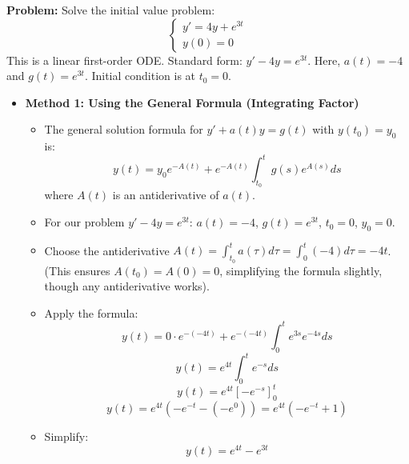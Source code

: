 \begin{cascade}
	\textbf{Problem:} Solve the initial value problem:
	$$ \begin{cases} y' = 4y + e^{3t} \\ y(0) = 0 \end{cases} $$
	This is a linear first-order ODE. Standard form: $y' - 4y = e^{3t}$.
	Here, $a(t) = -4$ and $g(t) = e^{3t}$. Initial condition is at $t_0=0$.

	\begin{itemize}
		\item \textbf{Method 1: Using the General Formula (Integrating Factor)}
		      \begin{itemize}
			      \item The general solution formula for $y' + a(t)y = g(t)$ with $y(t_0)=y_0$ is:
			            $$ y(t) = y_0 e^{-A(t)} + e^{-A(t)} \int_{t_0}^t g(s) e^{A(s)} ds $$
			            where $A(t)$ is an antiderivative of $a(t)$.
			      \item For our problem $y' - 4y = e^{3t}$: $a(t)=-4$, $g(t)=e^{3t}$, $t_0=0$, $y_0=0$.
			      \item Choose the antiderivative $A(t) = \int_{t_0}^t a(\tau) d\tau = \int_0^t (-4) d\tau = -4t$.
			            (This ensures $A(t_0)=A(0)=0$, simplifying the formula slightly, though any antiderivative works).
			      \item Apply the formula:
			            $$ y(t) = 0 \cdot e^{-(-4t)} + e^{-(-4t)} \int_{0}^t e^{3s} e^{-4s} ds $$
			            $$ y(t) = e^{4t} \int_{0}^t e^{-s} ds $$
			            $$ y(t) = e^{4t} \left[ -e^{-s} \right]_0^t $$
			            $$ y(t) = e^{4t} (-e^{-t} - (-e^0)) = e^{4t} (-e^{-t} + 1) $$
			      \item Simplify:
			            $$ y(t) = e^{4t} - e^{3t} $$
		      \end{itemize}


\end{itemize}
\end{cascade}
